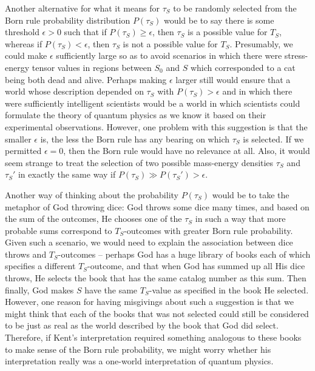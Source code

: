 \documentclass[12pt]{report}
\begin{document}
Another alternative for what it means for $\tau_S$ to be randomly selected from the Born rule probability distribution $P(\tau_S)$ would be to say there is some threshold $\epsilon>0$ such that if $P(\tau_S)\geq\epsilon$, then $\tau_S$ is a possible value for $T_S$, whereas if $P(\tau_S)<\epsilon$, then  $\tau_S$ is not a possible value for $T_S$. Presumably, we could make $\epsilon$ sufficiently large so as to avoid scenarios in which there were stress-energy tensor values in regions between  $S_0$ and $S$ which corresponded to a cat being both dead and alive. Perhaps making $\epsilon$ larger still would ensure that a world whose description depended on $\tau_S$ with  $P(\tau_S)>\epsilon$ and in which there were sufficiently intelligent scientists would be a world in which scientists could formulate the theory of quantum physics as we know it based on their experimental observations. However, one problem with this suggestion is that the smaller $\epsilon$ is, the less the Born rule has any bearing on which $\tau_S$ is selected. If we permitted $\epsilon=0$, then the Born rule would have no relevance at all. Also, it would seem strange to treat the selection of two possible mass-energy densities $\tau_S$ and $\tau_S'$ in exactly the same way if $P(\tau_S)\gg P(\tau_S')>\epsilon$. 

Another way of thinking about the probability $P(\tau_S)$ would be to take the metaphor of God throwing dice: God throws some dice many times, and based on the sum of the outcomes, He chooses one of the $\tau_S$ in such a way that more probable sums correspond to $T_S$-outcomes with greater Born rule probability. Given such a scenario, we would need to explain the association between dice throws and $T_S$-outcomes -- perhaps God has a huge library of books each of which specifies a different $T_S$-outcome, and that when God  has summed up all His dice throws, He selects the book that has the same catalog number as this sum. Then finally, God makes $S$ have the same $T_S$-value as specified in the book He selected. However, one reason for having misgivings about such a suggestion is that we might think that each of the books that was not selected could still be considered to be just as real as the world described by the book that God did select. Therefore, if Kent's interpretation required something analogous to these books to make sense of the Born rule probability, we might worry whether his interpretation  really was a one-world interpretation of quantum physics. 
\end{document}
